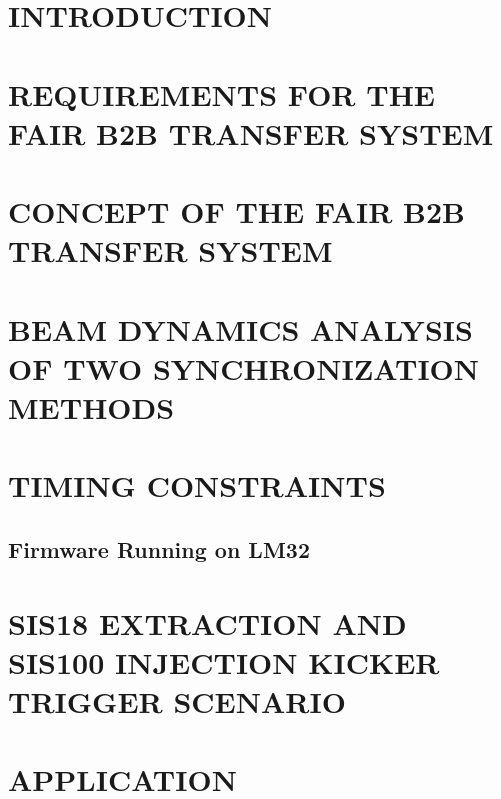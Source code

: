 \documentclass[%
 reprint,
 amsmath,amssymb,
 aps,
]{revtex4-1}
\begin{document}

\section{\label{sec:introduction}INTRODUCTION}


\section{\label{sec:WRnetwork}REQUIREMENTS FOR THE FAIR B2B TRANSFER SYSTEM}


\section{\label{concept}CONCEPT OF THE FAIR B2B TRANSFER SYSTEM}


\section{\label{dynamics}BEAM DYNAMICS ANALYSIS OF TWO SYNCHRONIZATION METHODS}


\section{\label{timing}TIMING CONSTRAINTS}


\subsection{\label{testsetup}Firmware Running on LM32}


%

\section{\label{kicker}SIS18 EXTRACTION AND SIS100 INJECTION KICKER TRIGGER SCENARIO}




\section{\label{application}APPLICATION}

\end{document}
